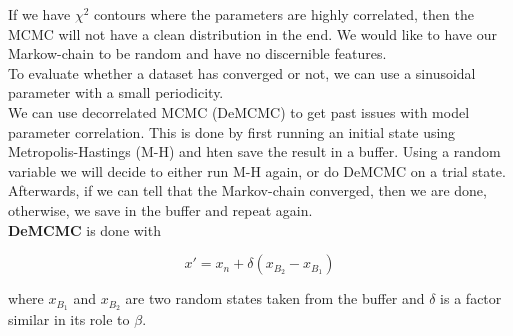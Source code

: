 \documentclass[]{article}
\begin{document}

If we have $\chi^2$ contours where the parameters are highly correlated, then the MCMC will not have a clean distribution in the end. We would like to have our Markow-chain to be random and have no discernible features.\\ 


To evaluate whether a dataset has converged or not, we can use a sinusoidal parameter with a small periodicity.\\

We can use decorrelated MCMC (DeMCMC) to get past issues with model parameter correlation. This is done by first running an initial state using Metropolis-Hastings (M-H) and hten save the result in a buffer. Using a random variable we will decide to either run M-H again, or do DeMCMC on a trial state. Afterwards, if we can tell that the Markov-chain converged, then we are done, otherwise, we save in the buffer and repeat again.\\


\textbf{DeMCMC} is done with 

\[x' = x_n +\delta(x_{B_2} - x_{B_1}) \]

where $x_{B_1}$ and $x_{B_2}$ are two random states taken from the buffer and $\delta$ is a factor similar in its role to $\beta$.\\
\end{document}
